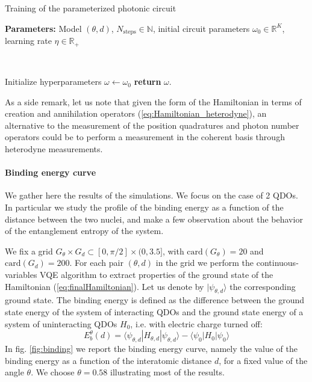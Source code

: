 \documentclass[reprint, amsmath, amssymb, floatfix, aps, pra]{revtex4-2}
\begin{document}
    \begin{algorithm}
        \caption{Training of the parameterized photonic circuit}\label{alg:training}
        \textbf{Parameters:} Model $(\theta, d)$, $N_\text{steps}\in\mathbb N$, initial circuit parameters $\omega_0\in\mathbb R^K$, learning rate $\eta\in\mathbb R_+$

        \

        Initialize hyperparameters $\omega \gets \omega_0$\;
        \textbf{return} $\omega$.
    \end{algorithm}

    As a side remark, let us note that given the form of the Hamiltonian in terms of creation and annihilation operators (\ref{eq:Hamiltonian_heterodyne}), an alternative to the measurement of the position quadratures and photon number operators could be to perform a measurement in the coherent basis through heterodyne measurements.
    \newline

\paragraph*{Binding energy curve}

    We gather here the results of the simulations. We focus on the case of 2 QDOs. In particular we study the profile of the binding energy as a function of the distance between the two nuclei, and make a few observation about the behavior of the entanglement entropy of the system.

    We fix a grid $G_\theta\times G_d\subset [0, \pi/2]\times (0, 3.5]$, with $\text{card}(G_\theta)=20$ and $\text{card}(G_d)=200$. For each pair $(\theta, d)$ in the grid we perform the continuous-variables VQE algorithm to extract properties of the ground state of the Hamiltonian (\ref{eq:finalHamiltonian}). Let us denote by $|\psi_{\theta, d}\rangle$ the corresponding ground state.
    The binding energy is defined as the difference between the ground state energy of the system of interacting QDOs and the ground state energy of a system of uninteracting QDOs $H_0$, i.e. with electric charge turned off:
    \begin{equation*}
        E^\theta_b(d) = \langle\psi_{\theta, d}|H_{\theta, d}|\psi_{\theta, d}\rangle - \langle\psi_0|H_0|\psi_0\rangle
    \end{equation*}
    In fig. \ref{fig:binding} we report the binding energy curve, namely the value of the binding energy as a function of the interatomic distance $d$, for a fixed value of the angle $\theta$. We choose $\theta=0.58$ illustrating most of the results.
\end{document}
